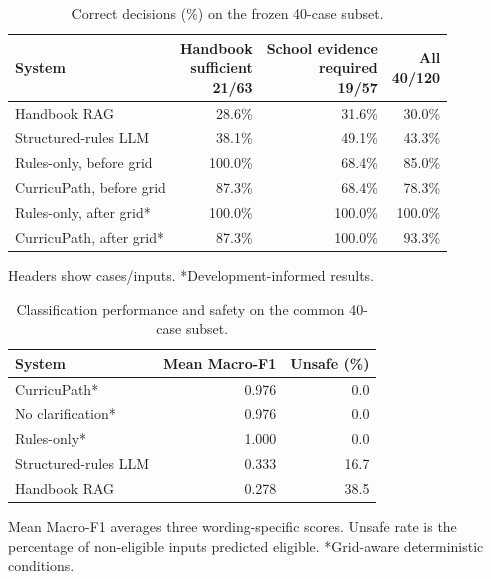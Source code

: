 \begin{table}[tb]
\caption{Correct decisions (\%) on the frozen 40-case subset.}
\label{tab:shared_evidence}
\centering
\small
\setlength{\tabcolsep}{3pt}
\begin{tabular}{p{29mm}rrr}
\hline
System & \shortstack{Handbook\\sufficient\\21/63} & \shortstack{School evidence\\required\\19/57} & \shortstack{All\\40/120}\\
\hline
Handbook RAG & 28.6\% & 31.6\% & 30.0\%\\
Structured-rules LLM & 38.1\% & 49.1\% & 43.3\%\\
Rules-only, before grid & 100.0\% & 68.4\% & 85.0\%\\
CurricuPath, before grid & 87.3\% & 68.4\% & 78.3\%\\
Rules-only, after grid* & 100.0\% & 100.0\% & 100.0\%\\
CurricuPath, after grid* & 87.3\% & 100.0\% & 93.3\%\\
\hline
\end{tabular}
\par\smallskip\noindent Headers show cases/inputs. *Development-informed results.
\end{table}

\begin{table}[tb]
\caption{Classification performance and safety on the common 40-case subset.}
\label{tab:shared_safety}
\centering
\setlength{\tabcolsep}{3pt}
\begin{tabular}{lrr}
\hline
System & Mean Macro-F1 & Unsafe (\%)\\
\hline
CurricuPath* & 0.976 & 0.0\\
No clarification* & 0.976 & 0.0\\
Rules-only* & 1.000 & 0.0\\
Structured-rules LLM & 0.333 & 16.7\\
Handbook RAG & 0.278 & 38.5\\
\hline
\end{tabular}
\par\smallskip\noindent Mean Macro-F1 averages three wording-specific scores. Unsafe rate is the percentage of non-eligible inputs predicted eligible. *Grid-aware deterministic conditions.
\end{table}

